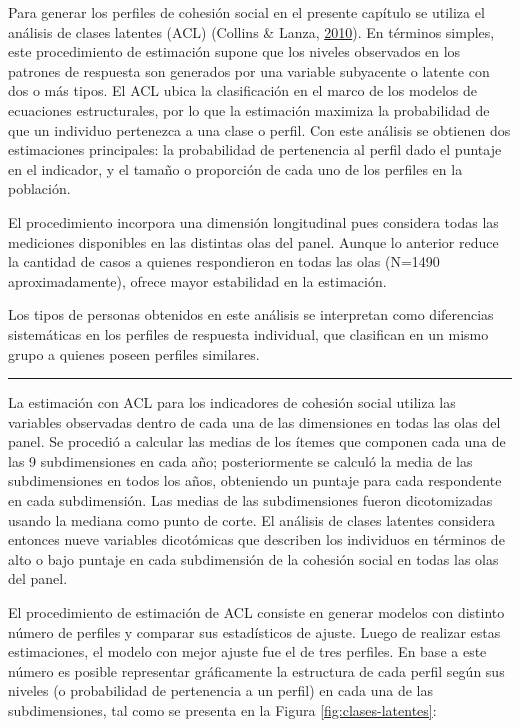 \documentclass[
  12pt,
]{book}
\begin{document}
Para generar los perfiles de cohesión social en el presente capítulo se utiliza el análisis de clases latentes (ACL) (Collins \& Lanza, \protect\hyperlink{ref-collins_latent_2010}{2010}). En términos simples, este procedimiento de estimación supone que los niveles observados en los patrones de respuesta son generados por una variable subyacente o latente con dos o más tipos. El ACL ubica la clasificación en el marco de los modelos de ecuaciones estructurales, por lo que la estimación maximiza la probabilidad de que un individuo pertenezca a una clase o perfil. Con este análisis se obtienen dos estimaciones principales: la probabilidad de pertenencia al perfil dado el puntaje en el indicador, y el tamaño o proporción de cada uno de los perfiles en la población.

El procedimiento incorpora una dimensión longitudinal pues considera todas las mediciones disponibles en las distintas olas del panel. Aunque lo anterior reduce la cantidad de casos a quienes respondieron en todas las olas (N=1490 aproximadamente), ofrece mayor estabilidad en la estimación.

Los tipos de personas obtenidos en este análisis se interpretan como diferencias sistemáticas en los perfiles de respuesta individual, que clasifican en un mismo grupo a quienes poseen perfiles similares.

\begin{center}\rule{0.5\linewidth}{0.5pt}\end{center}

La estimación con ACL para los indicadores de cohesión social utiliza las variables observadas dentro de cada una de las dimensiones en todas las olas del panel. Se procedió a calcular las medias de los ítemes que componen cada una de las 9 subdimensiones en cada año; posteriormente se calculó la media de las subdimensiones en todos los años, obteniendo un puntaje para cada respondente en cada subdimensión. Las medias de las subdimensiones fueron dicotomizadas usando la mediana como punto de corte. El análisis de clases latentes considera entonces nueve variables dicotómicas que describen los individuos en términos de alto o bajo puntaje en cada subdimensión de la cohesión social en todas las olas del panel.

El procedimiento de estimación de ACL consiste en generar modelos con distinto número de perfiles y comparar sus estadísticos de ajuste. Luego de realizar estas estimaciones, el modelo con mejor ajuste fue el de tres perfiles. En base a este número es posible representar gráficamente la estructura de cada perfil según sus niveles (o probabilidad de pertenencia a un perfil) en cada una de las subdimensiones, tal como se presenta en la Figura \ref{fig:clases-latentes}:
\end{document}
